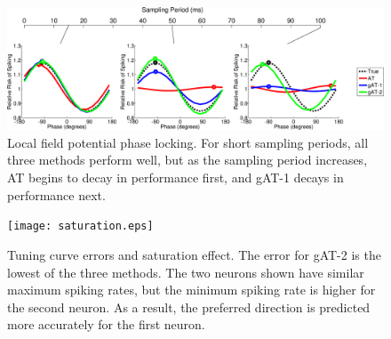 \documentclass[10 pt]{article}
\begin{document}
\begin{figure}[htbp]
\begin{center}
\includegraphics[scale=0.30]{LFP.eps}
\caption{Local field potential phase locking. For short sampling periods, all three methods perform well, but as the sampling period increases, AT begins to decay in performance first, and gAT-1 decays in performance next.}
\label{fig:LFP}
\end{center}
\end{figure}

\begin{figure}[htbp]
\begin{center}
\texttt{[image: saturation.eps]}
\label{fig:saturation}
\caption{Tuning curve errors and saturation effect. The error for gAT-2 is the lowest of the three methods. The two neurons shown have similar maximum spiking rates, but the minimum spiking rate is higher for the second neuron. As a result, the preferred direction is predicted more accurately for the first neuron.}
\end{center}
\end{figure}
\end{document}
